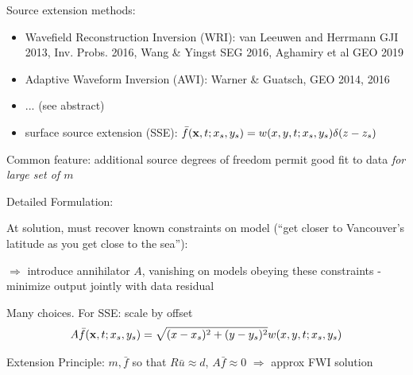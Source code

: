 \documentclass[xcolor=dvipsnames,12pt,aspectratio=169]{beamer}
\newcommand{\of}{\bar{f}}
\newcommand{\ou}{\bar{u}}
\begin{document}
\begin{frame}
Source extension methods:
\begin{itemize}
\item
Wavefield Reconstruction Inversion (WRI):
van Leeuwen and Herrmann GJI 2013, Inv. Probs. 2016, Wang \& Yingst SEG 2016, Aghamiry et al GEO 2019 
\item Adaptive Waveform Inversion (AWI): Warner \& Guatsch, GEO 2014, 2016
\item ... (see abstract)
\item {\color{blue} surface source extension (SSE):} $\of(\bx,t;x_s,y_s) = w(x,y,t; x_s,y_s)\delta(z-z_s)$
\end{itemize} 

Common feature: additional source degrees of freedom permit good fit to data {\em for large set of $m$}
\end{frame}

\begin{frame}
Detailed Formulation:

At solution, must recover known constraints on model (``get closer to Vancouver's latitude as you get close to the sea''): 

$\Rightarrow$ introduce {\color{blue} annihilator} $A$, vanishing on models obeying these constraints - minimize output jointly with data residual


Many choices. For SSE: scale by offset 
\[
A\of(\bx,t;x_s,y_s) = \sqrt{(x-x_s)^2+(y-y_s)^2}w(x,y,t;x_s,y_s)
\]

{\color {blue} Extension Principle:} $m,\of$ so  that $R\bar{u} \approx d$, $A\of \approx 0$ $\Rightarrow$ approx FWI solution
\end{frame}







\end{document}
